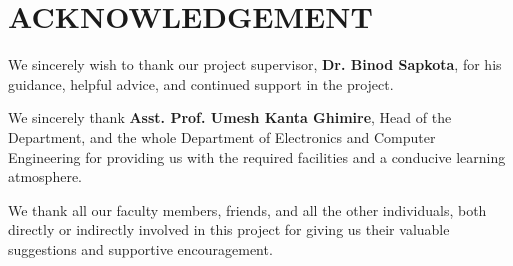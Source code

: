 \chapter*{ACKNOWLEDGEMENT}
{}

We sincerely wish to thank our project supervisor, \textbf{Dr. Binod Sapkota}, for his guidance, helpful advice, and continued support in the project. 

We sincerely thank \textbf{Asst. Prof. Umesh Kanta Ghimire}, Head of the Department, and the whole Department of Electronics and Computer Engineering for
providing us with the required facilities and a conducive learning atmosphere.

We thank all our faculty members, friends, and all the other individuals, both directly or indirectly involved in this project for giving us their valuable suggestions and supportive encouragement.

\vspace{1em}
\noindent \authorTable
